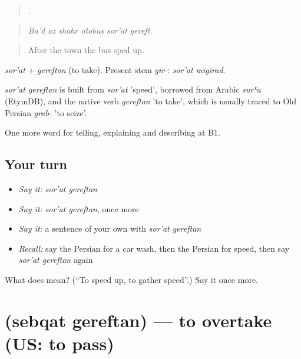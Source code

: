 \begin{quote}
     .
\end{quote}

\begin{quote}
\emph{Ba'd az shahr otobus sor'at gereft.}
\end{quote}

\begin{quote}
After the town the bus sped up.
\end{quote}

\emph{sor'at} + \emph{gereftan} (to take). Present stem \emph{gir-}: \emph{sor'at migirad}.

\begin{cousinweb}
\emph{sor'at gereftan} is built from \emph{sor'at} 'speed', borrowed from Arabic \emph{surʿa} (EtymDB), and the native verb \emph{gereftan} 'to take', which is usually traced to Old Persian \emph{grab-} 'to seize'.
\end{cousinweb}

\begin{grammarlens}[title={What you've built}]
One more word for telling, explaining and describing at B1.
\end{grammarlens}

\subsection*{Your turn}
\begin{itemize}
\raggedright
  \item \emph{Say it:} \emph{sor'at gereftan}
  \item \emph{Say it:} \emph{sor'at gereftan}, once more
  \item \emph{Say it:} a sentence of your own with \emph{sor'at gereftan}
  \item \emph{Recall:} say the Persian for a car wash, then the Persian for speed, then say \emph{sor'at gereftan} again
\end{itemize}

\begin{tcolorbox}[breakable,colback=teal!4,colframe=teal!35!black,title={Before you move on}]
What does   mean? (\textquotedblleft{}To speed up, to gather speed\textquotedblright{}.) Say it once more.
\end{tcolorbox}
\section[\texorpdfstring{\fa{سبقت} \fa{گرفتن} (sebqat gereftan)}{سبقت گرفتن (sebqat gereftan)}]{  (sebqat gereftan) — to overtake (US: to pass)}

